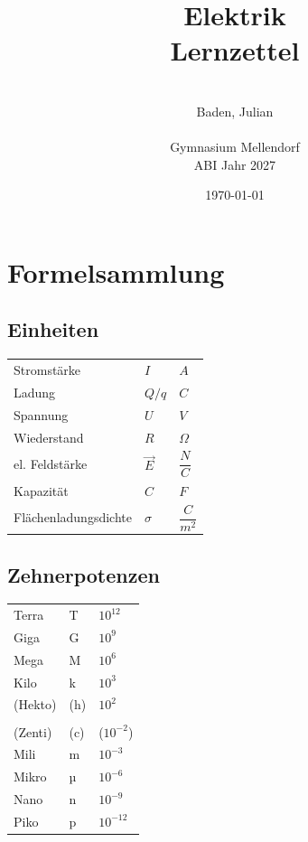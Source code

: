 \documentclass[a4paper]{article}
\title{\Huge{Elektrik\\Lernzettel}}
\date{\today}
\author{\quad\\Baden, Julian\\\quad\\Gymnasium Mellendorf\\ABI Jahr 2027}
\begin{document}
\maketitle
\thispagestyle{empty}
\newpage
\tableofcontents \thispagestyle{empty}
\newpage
{}


\section{Formelsammlung}
\subsection{Einheiten}

\begin{center}
    \begin{tabular}{ p{4cm} p{4cm} p{4cm} }
         Stromstärke            & $I$           & $A$                 \\[0,5cm]
         Ladung                 & $Q / q$  		& $C$ 			      \\[0,5cm]
         Spannung               & $U$           & $V$                 \\[0,5cm]
         Wiederstand            & $R$           & $\Omega$            \\[0,5cm]
         el. Feldstärke         & $\vec{E}$     & $\dfrac{N}{C}$      \\[0,5cm]
         Kapazität              & $C$           & $F$                 \\[0,5cm]
         Flächenladungsdichte   & $\sigma$      & $\dfrac{C}{m^2}$    \\[1cm]
    \end{tabular}
\end{center}


\subsection{Zehnerpotenzen}
\begin{center}
    \begin{tabular}{ p{4cm} p{4cm} p{4cm} }
		Terra & T & $10^{12}$ \\[0,5cm]
		Giga & G & $10^9$ \\[0,5cm]
		Mega & M & $10^6$ \\[0,5cm]
		Kilo & k & $10^3$ \\[0,5cm]
		(Hekto) & (h) & $10^2$ \\ [0,5cm]
			\hline \\[0,2cm]
		(Zenti) & (c) & ($10^{-2}$) \\[0,5cm]
		Mili & m & $10^{-3}$ \\[0,5cm]
		Mikro & µ & $10^{-6}$ \\[0,5cm]
		Nano & n & $10^{-9}$ \\[0,5cm]
		Piko & p & $10^{-12}$ \\[1cm]
    \end{tabular}
\end{center}
\end{document}
